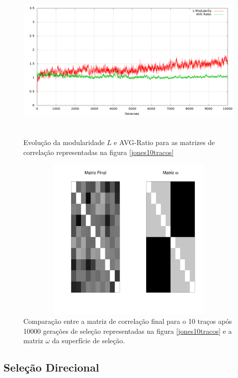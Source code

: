\begin{center}
\begin{figure}[htbp]
  \includegraphics[width=150mm, height=80mm]{figuras/jones10tracosStats.png}
  \caption{Evolução da modularidade $L$ e AVG-Ratio para as matrizes de
  correlação representadas na figura \ref{jones10tracos}}
  \label{jones10tracosStats}
\end{figure}
\end{center}

\begin{center}
\begin{figure}[htbp]
  \includegraphics[width=150mm, height=80mm]{figuras/Mat10tracos}
  \caption{Comparação entre a matriz de correlação final para o 10
  traços após 10000 gerações de seleção representadas na figura
  \ref{jones10tracos} e a matriz $\omega$ da superfície de seleção.}
  \label{MatJones10tracos}
\end{figure}
\end{center}


\subsection{Seleção Direcional}

